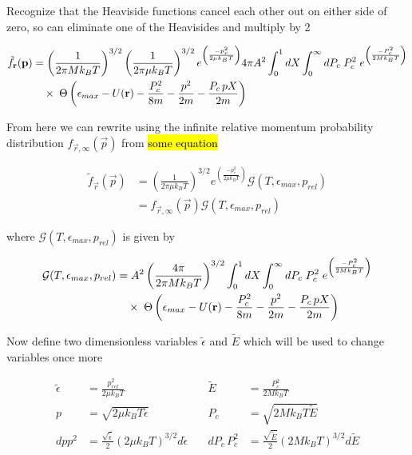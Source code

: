 Recognize that the Heaviside functions cancel each other out on either side of zero, so can eliminate one of the Heavisides and multiply by 2

\begin{equation}
\begin{split}
	 \tilde{f}_{\mathbf{r}}(\mathbf{p}) &= \left(\frac{1}{2 \pi M k_B T}\right)^{3/2} \left(\frac{1}{2 \pi \mu k_B T}\right)^{3/2} e^{\left(\frac{-p_r^2}{2 \mu k_B T}\right)} 4 \pi A^2 \int_0^1 dX \int_0^{\infty} dP_c \; P_c^2 \; e^{\left(\frac{-P_c^2}{2 M k_B T}\right)} \\ 
	 &\quad \times \; \Theta \left( {\epsilon_{max} - U(\mathbf{r}) - \frac{P_c^2}{8m} - \frac{p^2}{2m} - \frac{P_c \, p X}{2m}} \right) 
\end{split}
\end{equation}

From here we can rewrite using the infinite relative momentum probability distribution $f_{\vec{r}, \infty} (\vec{p})$ from \hl{some equation}

\begin{equation}
\begin{split}
	 \tilde{f}_{\vec{r}}(\vec{p}) &= \left(\frac{1}{2 \pi \mu k_B T}\right)^{3/2} e^{\left(\frac{-p_r^2}{2 \mu k_B T}\right)} \mathcal{G}(T, \epsilon_{max}, p_{rel}) \\
	 &= f_{\vec{r}, \infty} (\vec{p}) \mathcal{G}(T, \epsilon_{max}, p_{rel})
\end{split}
\end{equation}

where $\mathcal{G}(T, \epsilon_{max}, p_{rel})$ is given by

\begin{equation} \label{eq:mom_dist_st_3}
\begin{split}
	\mathcal{G}(T, \epsilon_{max}, p_{rel}) &= A^2 \left(\frac{4 \pi}{2 \pi M k_B T}\right)^{3/2} \int_0^1 dX \int_0^{\infty} dP_c \; P_c^2 \; e^{\left(\frac{-P_c^2}{2 M k_B T}\right)} \\ 
	 &\quad \times \; \Theta \left( {\epsilon_{max} - U(\mathbf{r}) - \frac{P_c^2}{8m} - \frac{p^2}{2m} - \frac{P_c \, p X}{2m}} \right) 
\end{split}
\end{equation}

Now define two dimensionless variables $\tilde{\epsilon}$ and $\tilde{E}$ which will be used to change variables once more

\begin{align*}
	\tilde{\epsilon} &= \frac{p_{rel}^2}{2 \mu k_B T} 												&\quad 		\tilde{E}  &= \frac{P_c^2}{2 M k_B T} \\
	p 				 &= \sqrt{2 \mu k_B T \tilde{\epsilon}}    										&\quad  	P_c 	   &= \sqrt{2 M k_B T \tilde{E}} \\
	dp p^2 			 &= \frac{\sqrt{\tilde{\epsilon}}}{2}(2 \mu k_B T)^{3/2} d \tilde{\epsilon} 	&\quad		dP_c \, P_c^2 &= \frac{\sqrt{\tilde{E}}}{2}(2 M k_B T)^{3/2} d \tilde{E}
\end{align*}

